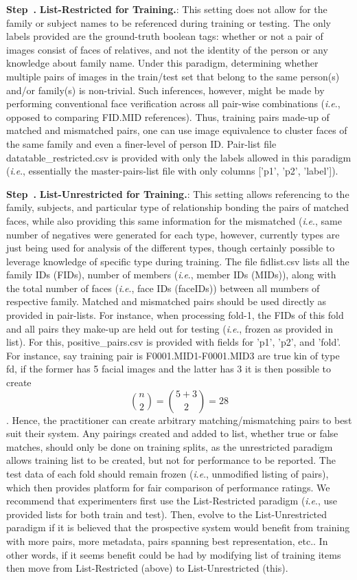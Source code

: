 \documentclass[a4paper,9pt]{extarticle}
\makeatletter
\newcommand{\ie}{\textit{i}.\textit{e}., }
\newcommand*{\etc}{etc.\@\xspace}
\newcounter{step}[section]
\newenvironment{step}[2][]
{%
    \refstepcounter{step}\par\medskip
    \noindent\textbf{Step~\thestep. #1}{\textbf{#2}:}\rmfamily
}%
{\medskip}
\makeatother
\begin{document}
\begin{multicols}{2}
\begin{step}{List-Restricted for Training.}\label{1ststep} 
This setting does not allow for the family or subject names to be referenced during training or testing. The only labels provided are the ground-truth boolean tags: whether or not a pair of images consist of faces of relatives, and not the identity of the person or any knowledge about family name. Under this paradigm, determining whether multiple pairs of images in the train/test set that belong to the same person(s) and/or family(s) is non-trivial. Such inferences, however, might be made by performing conventional face verification across all pair-wise combinations (\ie opposed to comparing FID.MID references). Thus, training pairs made-up of matched and mismatched pairs, one can use image equivalence to cluster faces of the same family and even a finer-level of person ID. Pair-list file datatable\_restricted.csv is provided with only the labels allowed in this paradigm (\ie essentially the master-pairs-list file with only columns ['p1', 'p2', 'label']).
    \end{step}
    \begin{step}{List-Unrestricted for Training.} This setting allows referencing to the family, subjects, and particular type of relationship bonding the pairs of matched faces, while also providing this same information for the mismatched (\ie same number of negatives were generated for each type, however, currently types are just being used for analysis of the different types, though certainly possible to leverage knowledge of specific type during training. The file fidlist.csv lists all the family IDs (FIDs), number of members (\ie member IDs (MIDs)), along with the total number of faces (\ie face IDs (faceIDs)) between all mumbers of respective family. Matched and mismatched pairs should be used directly as provided in pair-lists. For instance, when processing fold-1, the FIDs of this fold and all pairs they make-up are held out for testing (\ie frozen as provided in list). For this, positive\_pairs.csv is provided with fields for 'p1', 'p2', and 'fold'. For instance, say training pair is F0001.MID1-F0001.MID3 are true kin of type \gls{fd}, if the former has 5 facial images and the latter has 3 it is then possible to create $$\binom{n}{2}=\binom{5+3}{2}=28$$. Hence, the practitioner can create arbitrary matching/mismatching pairs to best suit their system. Any pairings created and added to list, whether true or false matches, should only be done on training splits, as the unrestricted paradigm allows training list to be created, but not for performance to be reported. The test data of each fold should remain frozen (\ie unmodified listing of pairs), which then provides platform for fair comparison of performance ratings. We recommend that experimenters first use the List-Restricted paradigm (\ie use provided lists for both train and test). Then, evolve to the List-Unrestricted paradigm if it is believed that the prospective system would benefit from training with more pairs, more metadata, pairs spanning best representation, \etc. In other words, if it seems benefit could be had by modifying list of training items then move from List-Restricted (above) to List-Unrestricted (this). 

\end{step}
\end{multicols}
\end{document}
